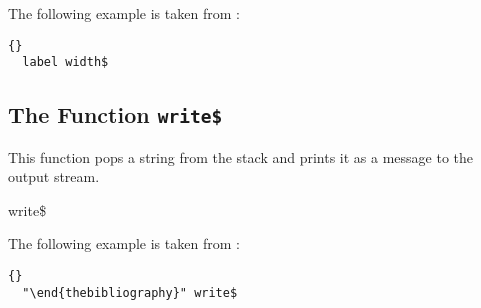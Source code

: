 The following example is taken from :

\begin{lstlisting}{}
  label width$
\end{lstlisting}


\subsection{The Function \texttt{write\$}}%

This function pops a string from the stack and prints it as a
message to the output stream.

\begin{BstFunction}{write\$}
\end{BstFunction}

The following example is taken from :

\begin{lstlisting}{}
  "\end{thebibliography}" write$
\end{lstlisting}

%
\endinput
%
